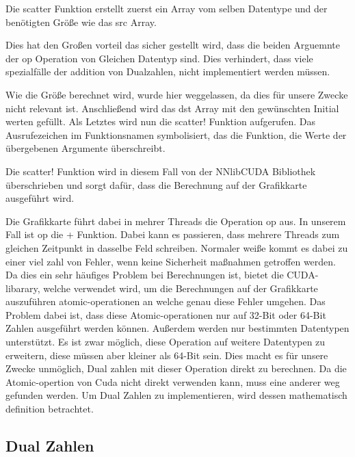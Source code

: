 
Die scatter Funktion erstellt zuerst ein Array vom selben Datentype und der benötigten Größe wie das src Array. 

Dies hat den Großen vorteil das sicher gestellt wird, dass die beiden Arguemnte der op Operation von Gleichen Datentyp sind. 
Dies verhindert, dass viele spezialfälle der addition von Dualzahlen, nicht implementiert werden müssen.

Wie die Größe berechnet wird, wurde hier weggelassen, da dies für unsere Zwecke nicht relevant ist. 
Anschließend wird das dst Array mit den gewünschten Initial werten gefüllt.
Als Letztes wird nun die scatter! Funktion aufgerufen.
Das Ausrufezeichen im Funktionsnamen symbolisiert, das die Funktion, die Werte der übergebenen Argumente überschreibt.

Die scatter! Funktion wird in diesem Fall von der NNlibCUDA Bibliothek überschrieben und sorgt dafür, 
dass die Berechnung auf der Grafikkarte ausgeführt wird.

Die Grafikkarte führt dabei in mehrer Threads die Operation op aus. In unserem Fall ist op die + Funktion.
Dabei kann es passieren, dass mehrere Threads zum gleichen Zeitpunkt in dasselbe Feld schreiben.
Normaler weiße kommt es dabei zu einer viel zahl von Fehler, wenn keine Sicherheit maßnahmen getroffen werden. 
Da dies ein sehr häufiges Problem bei Berechnungen ist, bietet die CUDA-libarary, 
welche verwendet wird, um die Berechnungen auf der Grafikkarte auszuführen atomic-operationen an
welche genau diese Fehler umgehen.
Das Problem dabei ist, dass diese Atomic-operationen nur auf 32-Bit oder 64-Bit Zahlen ausgeführt werden können.
Außerdem werden nur bestimmten Datentypen unterstützt.
Es ist zwar möglich, diese Operation auf weitere Datentypen zu erweitern, diese müssen aber kleiner als 64-Bit sein. 
Dies macht es für unsere Zwecke unmöglich, Dual zahlen mit dieser Operation direkt zu berechnen.
Da die Atomic-opertion von Cuda nicht direkt verwenden kann, muss eine anderer weg gefunden werden.
Um Dual Zahlen zu implementieren, wird dessen mathematisch definition betrachtet.

\subsection{Dual Zahlen} \label{sec:dual_zahlen}

